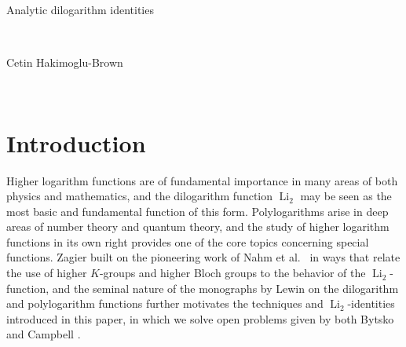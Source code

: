 \documentclass[12pt]{article}
\begin{document}
\begin{center}
{\Large Analytic dilogarithm identities}

 \ 

Cetin Hakimoglu-Brown

 \ 

\end{center}

\begin{abstract}
 We introduce dilogarithm identities through a beta integral-based technique that we apply to provide analytic proofs of previously 
 conjectured dilogarithm relations, solving open problems given by both Bytsko and Campbell, and that we further apply to construct 
 and prove new ladder relations with quartic and sextic bases. We also apply our method to introduce and prove two-term 
 $\operatorname{Li}_2$-relations and ladder-like identities with arguments in algebraic number fields such as $\mathbb{Q}(\sqrt{2})$, 
 $\mathbb{Q}(\sqrt{3})$, $\mathbb{Q}(\sqrt{5})$, and $\mathbb{Q}(\sqrt{-7})$. Moreover, single-term dilogarithm evaluations 
 are introduced and derived. 
\end{abstract}


\vspace{0.1in}


\section{Introduction}
 Higher logarithm functions are of fundamental importance in many areas of both physics and mathematics, and the dilogarithm function 
 $\operatorname{Li}_{2}$ may be seen as the most basic and fundamental function of this form. Polylogarithms arise in deep areas of 
 number theory and quantum theory, and the study of higher logarithm functions in its own right provides one of the core topics 
 concerning special functions. Zagier \cite{Zagier2007} built on the pioneering work of Nahm et al.\ 
 \cite{Nahm1995,Nahm2007,Nahm1994,NahmRecknagelTerhoeven1993} in ways that relate the use of higher $K$-groups and higher 
 Bloch groups to the behavior of the $\operatorname{Li}_{2}$-function, and the seminal nature of the monographs by Lewin on the 
 dilogarithm and polylogarithm functions \cite{Lewin1958,Lewin1981,Lewin1991text} further motivates the techniques and 
 $ \operatorname{Li}_{2}$-identities introduced in this paper, in which we solve open problems given by both Bytsko 
 \cite{Bytsko1999} and Campbell \cite{Campbell2025}. 
\end{document}
